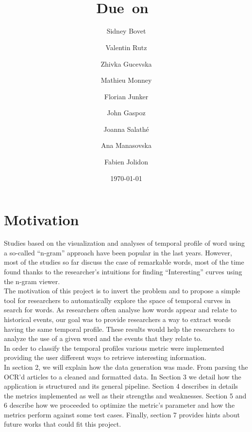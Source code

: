 \documentclass{article}
\title{
\vspace{2in}
\textmd{\textbf{\hmwkTitle}}\\
\normalsize\vspace{0.1in}\small{Due\ on\ \hmwkDueDate}\\
\vspace{3in}
}
\author{Sidney Bovet \and Valentin Rutz \and Zhivka Gucevska  \and Mathieu Monney\and Florian Junker\and John Gaspoz\and Joanna Salathé\and Ana Manasovska\and Fabien Jolidon}
\date{\today} %
\begin{document}
\maketitle



\newpage
\tableofcontents
\newpage


\section{Motivation}
Studies based on the visualization and analyses of temporal profile of word using a so-called “n-gram” approach have been popular in the last years. However, most of the studies so far discuss the case of remarkable words, most of the time found thanks to the researcher’s intuitions for finding “Interesting” curves using the n-gram viewer.\\

The motivation of this project is to invert the problem and to propose a simple tool for researchers to automatically explore the space of temporal curves in search for words. As researchers often analyse how words appear and relate to historical events, our goal was to provide researchers a way to extract words having the same temporal profile. These results would help the researchers to analyze the use of a given word and the events that they relate to. \\

In order to classify the temporal profiles various metric were implemented providing the user different ways to retrieve interesting information. \\

In section 2, we will explain how the data generation was made. From parsing the OCR'd articles to a cleaned and formatted data. In Section 3 we detail how the application is structured and its general pipeline. Section 4 describes in details the metrics implemented as well as their strengths and weaknesses. Section 5 and 6 describe how we proceeded to optimize the metric's parameter and how the metrics perform against some test cases. Finally, section 7 provides hints about future works that could fit this project.\\
\end{document}
